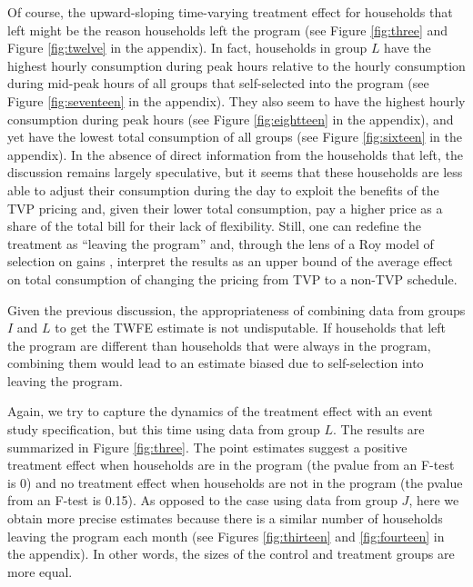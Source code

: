 \documentclass[12pt]{article}
\begin{document}
Of course, the upward-sloping time-varying treatment effect for households that left might be the reason households left the program (see Figure \ref{fig:three} and Figure \ref{fig:twelve} in the appendix). In fact, households in group $L$ have the highest hourly consumption during peak hours relative to the hourly consumption during mid-peak hours of all groups that self-selected into the program (see Figure \ref{fig:seventeen} in the appendix). They also seem to have the highest hourly consumption during peak hours (see Figure \ref{fig:eightteen} in the appendix), and yet have the lowest total consumption of all groups (see Figure \ref{fig:sixteen} in the appendix). In the absence of direct information from the households that left, the discussion remains largely speculative, but it seems that these households are less able to adjust their consumption during the day to exploit the benefits of the TVP pricing and, given their lower total consumption, pay a higher price as a share of the total bill for their lack of flexibility. Still, one can redefine the treatment as \enquote{leaving the program} and, through the lens of a Roy model of selection on gains \citep{heckmanChapter70Econometric2007}, interpret the results as an upper bound of the average effect on total consumption of changing the pricing from TVP to a non-TVP schedule.


Given the previous discussion, the appropriateness of combining data from groups  $I$ and $L$ to get the TWFE estimate is not undisputable. If households that left the program are different than households that were always in the program, combining them would lead to an estimate biased due to self-selection into leaving the program.

Again, we try to capture the dynamics of the treatment effect with an event study specification, but this time using data from group $L$. The results are summarized in Figure \ref{fig:three}. The point estimates suggest a positive treatment effect when households are in the program (the pvalue from an F-test is 0) and no treatment effect when households are not in the program (the pvalue from an F-test is 0.15). As opposed to the case using data from group  $J$, here we obtain more precise estimates because there is a similar number of households leaving the program each month (see Figures \ref{fig:thirteen} and \ref{fig:fourteen} in the appendix). In other words, the sizes of the control and treatment groups are more equal.
\end{document}
